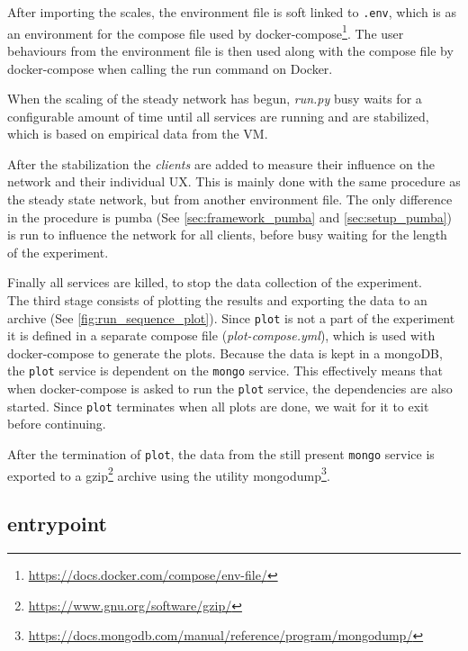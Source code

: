 After importing the scales, the environment file is soft linked to \texttt{.env}, which is as an environment for the compose file used by docker-compose\footnote{\url{https://docs.docker.com/compose/env-file/}}.
The user behaviours from the environment file is then used along with the compose file by docker-compose when calling the run command on Docker.

When the scaling of the steady network has begun, \textit{run.py} busy waits for a configurable amount of time until all services are running and are stabilized, which is based on empirical data from the \ac{VM}.

After the stabilization the \textit{clients} are added to measure their influence on the network and their individual \ac{UX}. This is mainly done with the same procedure as the steady state network, but from another environment file. The only difference in the procedure is pumba (See \autoref{sec:framework_pumba} and \ref{sec:setup_pumba}) is run to influence the network for all clients, before busy waiting for the length of the experiment.

Finally all services are killed, to stop the data collection of the experiment.
\\


\noindent The third stage consists of plotting the results and exporting the data to an archive (See \autoref{fig:run_sequence_plot}). Since \texttt{plot} is not a part of the experiment it is defined in a separate compose file (\textit{plot-compose.yml}), which is used with docker-compose to generate the plots. Because the data is kept in a mongoDB, the \texttt{plot} service is dependent on the \texttt{mongo} service. This effectively means that when docker-compose is asked to run the \texttt{plot} service, the dependencies are also started. Since \texttt{plot} terminates when all plots are done, we wait for it to exit before continuing.

After the termination of \texttt{plot}, the data from the still present \texttt{mongo} service is exported to a gzip\footnote{\url{https://www.gnu.org/software/gzip/}} archive using the utility mongodump\footnote{\url{https://docs.mongodb.com/manual/reference/program/mongodump/}}. 

\subsection{entrypoint}
\label{sec:experiment_entrypoint}

